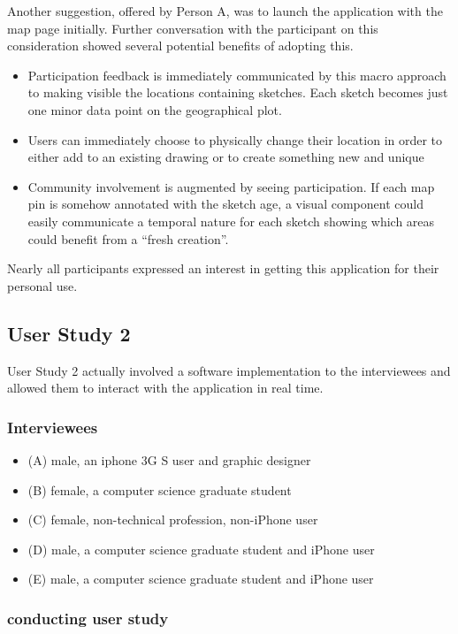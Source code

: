\documentclass{chi2009}
\begin{document}
Another suggestion, offered by Person A, was to launch the application with the
map page initially.  Further conversation with the participant on this
consideration showed several potential benefits of adopting this.
\begin{itemize}
\item Participation feedback is immediately communicated by this macro approach
to making visible the locations containing sketches.  Each sketch becomes just
one minor data point on the geographical plot.
\item Users can immediately choose to physically change their location in order
to either add to an existing drawing or to create something new and unique
\item Community involvement is augmented by seeing participation.  If each map
pin is somehow annotated with the sketch age, a visual component could easily
communicate a temporal nature for each sketch showing which areas could benefit
from a ``fresh creation''.
\end{itemize}

Nearly all participants expressed an interest in getting this application for
their personal use.

\subsection{ User Study 2 }

User Study 2 actually involved a software implementation to the interviewees
and allowed them to interact with the application in real time.

\subsubsection{Interviewees}

\begin{itemize}
\item (A) male, an iphone 3G S user and graphic designer
\item (B) female, a computer science graduate student
\item (C) female, non-technical profession, non-iPhone user
\item (D) male, a computer science graduate student and iPhone user
\item (E) male, a computer science graduate student and iPhone user
\end{itemize}

\subsubsection{conducting user study}
\end{document}

